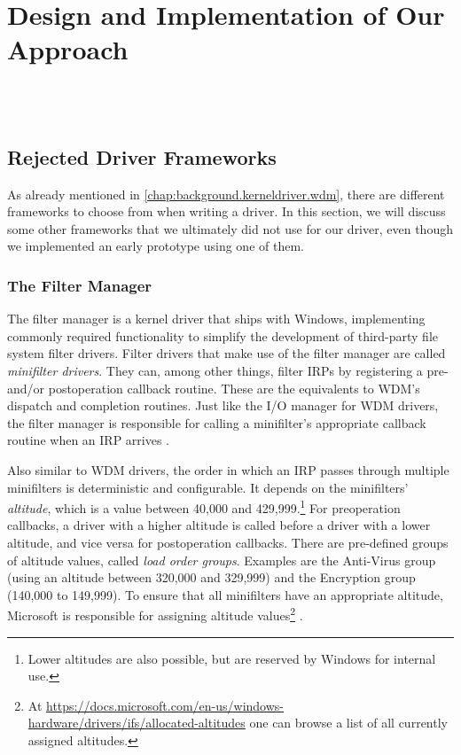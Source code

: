 \chapter{Design and Implementation of Our Approach}
\label{chap:ourapproach}
\\
\\

\section{Rejected Driver Frameworks}
\label{chap:ourapproach.rejected}
As already mentioned in \autoref{chap:background.kerneldriver.wdm}, there are different frameworks to choose from when writing a driver. In this section, we will discuss some other frameworks that we ultimately did not use for our driver, even though we implemented an early prototype using one of them.

\subsection{The Filter Manager}
\label{chap:ourapproach.rejected.fltmgr}
The filter manager is a kernel driver that ships with Windows, implementing commonly required functionality to simplify the development of third-party file system filter drivers. Filter drivers that make use of the filter manager are called \emph{minifilter drivers}. They can, among other things, filter IRPs by registering a pre- and/or postoperation callback routine. These are the equivalents to WDM's dispatch and completion routines. Just like the I/O manager for WDM drivers, the filter manager is responsible for calling a minifilter's appropriate callback routine when an IRP arrives \cite{Fltmgr}.

Also similar to WDM drivers, the order in which an IRP passes through multiple minifilters is deterministic and configurable. It depends on the minifilters' \emph{altitude}, which is a value between 40,000 and 429,999.\footnote{\label{fn:ourapproach.rejected.altitudevalues} Lower altitudes are also possible, but are reserved by Windows for internal use.} For preoperation callbacks, a driver with a higher altitude is called before a driver with a lower altitude, and vice versa for postoperation callbacks. There are pre-defined groups of altitude values, called \emph{load order groups}. Examples are the Anti-Virus group (using an altitude between 320,000 and 329,999) and the Encryption group (140,000 to 149,999). To ensure that all minifilters have an appropriate altitude, Microsoft is responsible for assigning altitude values\footnote{\label{fn:ourapproach.rejected.assignedaltitudes} At \url{https://docs.microsoft.com/en-us/windows-hardware/drivers/ifs/allocated-altitudes} one can browse a list of all currently assigned altitudes.} \cite{Fltmgr}.

